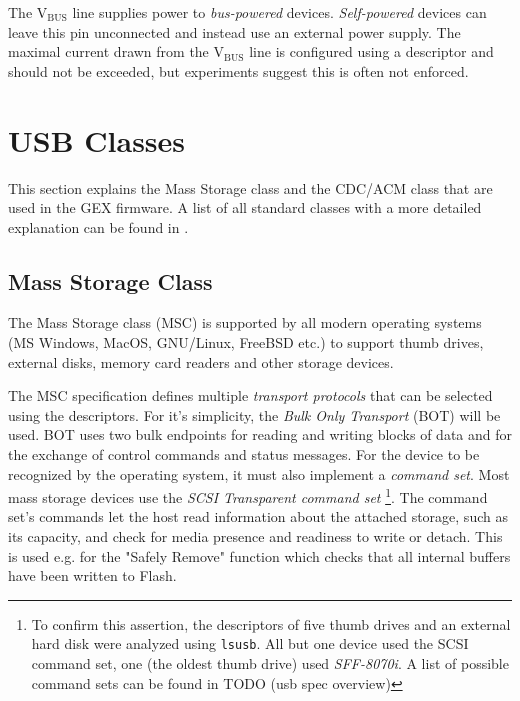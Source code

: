 The V$_\mathrm{BUS}$ line supplies power to \textit{bus-powered} devices. \textit{Self-powered} devices can leave this pin unconnected and instead use an external power supply. The maximal current drawn from the V$_\mathrm{BUS}$ line is configured using a descriptor and should not be exceeded, but experiments suggest this is often not enforced.

\section{USB Classes}

This section explains the Mass Storage class and the CDC/ACM class that are used in the GEX firmware. A list of all standard classes with a more detailed explanation can be found in .

\subsection{Mass Storage Class}

The Mass Storage class (MSC) is supported by all modern operating systems (MS Windows, MacOS, GNU/Linux, FreeBSD etc.) to support thumb drives, external disks, memory card readers and other storage devices.

The MSC specification defines multiple \textit{transport protocols} that can be selected using the descriptors. For it's simplicity, the \textit{Bulk Only Transport} (BOT) will be used. BOT uses two bulk endpoints for reading and writing blocks of data and for the exchange of control commands and status messages. For the device to be recognized by the operating system, it must also implement a \textit{command set}. Most mass storage devices use the \textit{SCSI Transparent command set} 
\footnote{To confirm this assertion, the descriptors of five thumb drives and an external hard disk were analyzed using \verb|lsusb|. All but one device used the SCSI command set, one (the oldest thumb drive) used \textit{SFF-8070i}. A list of possible command sets can be found in TODO (usb spec overview)}.
The command set's commands let the host read information about the attached storage, such as its capacity, and check for media presence and readiness to write or detach. This is used e.g. for the "Safely Remove" function which checks that all internal buffers have been written to Flash.

